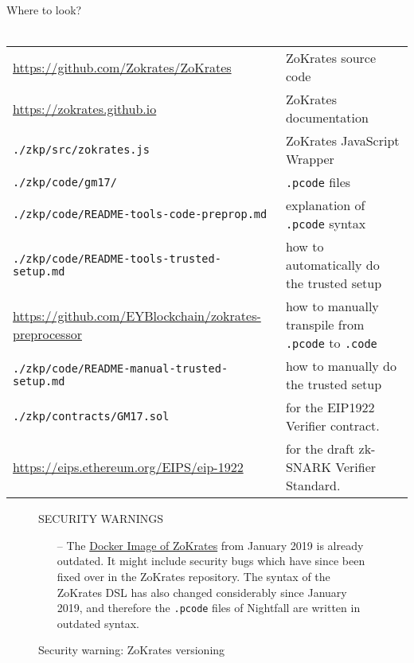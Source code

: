 \begin{center}
  \begin{mdframed}[backgroundcolor=verylightblue]
    Where to look?\\
    \\
    \begin{tabular}{lp{14cm}}
      \url{https://github.com/Zokrates/ZoKrates} & ZoKrates source code\\
      \url{https://zokrates.github.io} & ZoKrates documentation\\
      \texttt{./zkp/src/zokrates.js} & ZoKrates JavaScript Wrapper\\
      \texttt{./zkp/code/gm17/} & \texttt{.pcode} files\\
      \texttt{./zkp/code/README-tools-code-preprop.md} & explanation of \texttt{.pcode} syntax\\
      \texttt{./zkp/code/README-tools-trusted-setup.md} & how to automatically do the trusted setup\\
      \url{https://github.com/EYBlockchain/zokrates-preprocessor} & how to manually transpile from \texttt{.pcode} to \texttt{.code}\\ 
      \texttt{./zkp/code/README-manual-trusted-setup.md} & how to manually do the trusted setup\\
      \texttt{./zkp/contracts/GM17.sol} & for the EIP1922 Verifier contract.\\
      \url{https://eips.ethereum.org/EIPS/eip-1922} & for the draft zk-SNARK Verifier Standard.
    \end{tabular}
  \end{mdframed}
\end{center}


\begin{figure}[H]
  \begin{center}
    \begin{mdframed}[backgroundcolor=verylightred]
      \noindent
      SECURITY WARNINGS 
      \begin{itemize}
        \item[--] The \href{https://hub.docker.com/r/michaelconnor/zok}{Docker Image of ZoKrates} from January 2019 is already outdated. It might include security bugs which have since been fixed over in the ZoKrates repository. The syntax of the ZoKrates DSL has also changed considerably since January 2019, and therefore the \texttt{.pcode} files of Nightfall are written in outdated syntax.
      \end{itemize} 
    \end{mdframed} 
  \end{center}
  \caption{Security warning: ZoKrates versioning}
  \label{fig:zokratesWarning}
\end{figure}